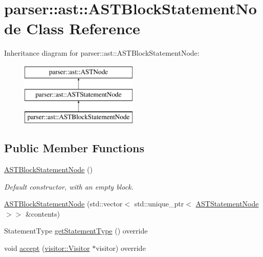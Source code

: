 \hypertarget{classparser_1_1ast_1_1ASTBlockStatementNode}{}\section{parser\+:\+:ast\+:\+:A\+S\+T\+Block\+Statement\+Node Class Reference}
\label{classparser_1_1ast_1_1ASTBlockStatementNode}
Inheritance diagram for parser\+:\+:ast\+:\+:A\+S\+T\+Block\+Statement\+Node\+:\begin{figure}[H]
\begin{center}
\leavevmode
\includegraphics[height=3.000000cm]{d0/d01/classparser_1_1ast_1_1ASTBlockStatementNode}
\end{center}
\end{figure}
\subsection*{Public Member Functions}
\begin{DoxyCompactItemize}
\item 
\mbox{\label{classparser_1_1ast_1_1ASTBlockStatementNode_a029059bf25ef46594d1c48bff34c6612}} 
\hyperlink{classparser_1_1ast_1_1ASTBlockStatementNode_a029059bf25ef46594d1c48bff34c6612}{A\+S\+T\+Block\+Statement\+Node} ()
\begin{DoxyCompactList}\small\item\em Default constructor, with an empty block. \end{DoxyCompactList}\item 
\hyperlink{classparser_1_1ast_1_1ASTBlockStatementNode_a69b3e477b9945bb1567560f2951c9bcd}{A\+S\+T\+Block\+Statement\+Node} (std\+::vector$<$ std\+::unique\+\_\+ptr$<$ \hyperlink{classparser_1_1ast_1_1ASTStatementNode}{A\+S\+T\+Statement\+Node} $>$$>$ \&contents)
\item 
Statement\+Type \hyperlink{classparser_1_1ast_1_1ASTBlockStatementNode_aec80a6d582f0b9691dbd33d0d5ecb975}{get\+Statement\+Type} () override
\item 
void \hyperlink{classparser_1_1ast_1_1ASTBlockStatementNode_ae0e7e04747661471aade0c1509c37422}{accept} (\hyperlink{classvisitor_1_1Visitor}{visitor\+::\+Visitor} $\ast$visitor) override
\end{DoxyCompactItemize}
